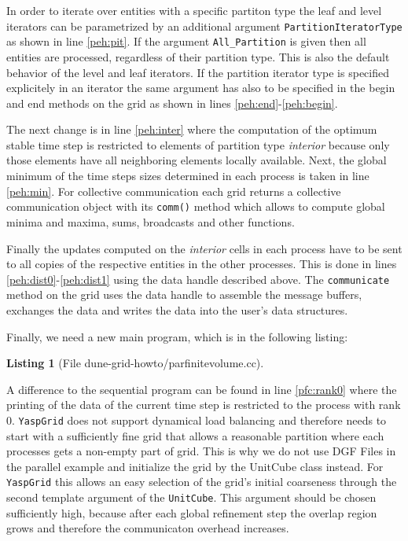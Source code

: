 \documentclass[11pt,a4paper,headinclude,footinclude,DIV16,normalheadings]{scrreprt}
\newtheorem{lst}{Listing}
\begin{document}
In order to iterate over entities with a specific partiton type the
leaf and level iterators can be parametrized by an additional argument
\lstinline!PartitionIteratorType! as shown in line \ref{peh:pit}. If
the argument \lstinline!All_Partition! is given then all entities are
processed, regardless of their partition type. This is also the
default behavior of the level and leaf iterators. If the partition
iterator type is specified explicitely in an iterator the same
argument has also to be specified in the begin and end methods on the
grid as shown in lines \ref{peh:end}-\ref{peh:begin}.

The next change is in line \ref{peh:inter} where the computation of
the optimum stable time step is restricted to elements of partition
type \textit{interior} because only those elements have all neighboring
elements locally available. Next, the global minimum of the time steps
sizes determined in each process is taken in line \ref{peh:min}. For
collective communication each grid returns a collective communication
object with its \lstinline!comm()! method which allows to compute
global minima and maxima, sums, broadcasts and other functions.

Finally the updates computed on the \textit{interior} cells in each
process have to be sent to all copies of the respective entities in
the other processes. This is done in lines
\ref{peh:dist0}-\ref{peh:dist1} using the data handle described above.
The \lstinline!communicate! method on the grid uses the data handle to
assemble the message buffers, exchanges the data and writes the data
into the user's data structures.

Finally, we need a new main program, which is in the following listing: 

\begin{lst}[File dune-grid-howto/parfinitevolume.cc] \mbox{}
\nopagebreak

\end{lst}

A difference to the sequential program can be found in line
\ref{pfc:rank0} where the printing of the data of the current time
step is restricted to the process with rank 0. 
\lstinline!YaspGrid! does not support dynamical load balancing and therefore
needs to start with a sufficiently fine grid that allows a reasonable partition
where each processes gets a non-empty part of grid. This is why we do not use
DGF Files in the parallel example and initialize the grid by the UnitCube class
instead. For \lstinline!YaspGrid! this allows an easy selection of the grid's
initial coarseness through the second template argument of the
\lstinline!UnitCube!. This argument should be chosen sufficiently high, because
after each global refinement step the overlap region grows and therefore the
communicaton overhead increases.
\end{document}
